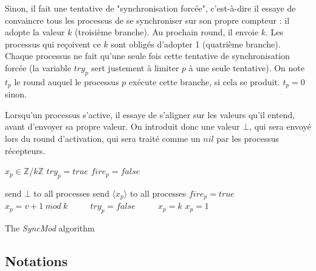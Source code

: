 \documentclass{article}
\begin{document}
Sinon, il fait une tentative de "synchronisation forcée", c'est-à-dire il essaye de convaincre tous les processus de se synchroniser sur son propre compteur :
il adopte la valeur $k$ (troisième branche). Au prochain round, il envoie $k$.  Les processus qui reçoivent ce $k$ sont obligés d'adopter 1 (quatrième branche).
Chaque processus ne fait qu'une seule fois cette tentative de synchronisation forcée (la variable $try_p$ sert justement à limiter $p$ à une seule tentative).
On note $t_p$ le round auquel le processus $p$ exécute cette branche, si cela se produit. $t_p = 0$ sinon.

Lorsqu'un processus s'active, il essaye de s'aligner sur les valeurs qu'il entend, avant d'envoyer sa propre valeur.
On introduit donc une valeur $\bot$, qui sera envoyé lors du round d'activation, qui sera traité comme un $nil$ par les processus récepteurs.

\pagebreak[1]

\begin{algorithm}[htb]
\begin{distribalgo}[1]
\BLANK {}
	\STATE $x_p \in \mathds{Z}/k\mathds{Z}$
	\STATE $try_p = true$
	\STATE $fire_p = false$

\ENDINDENT \BLANK

    \STATE send $\bot$ to all processes
  \ENDINDENT
\ENDINDENT
  \BLANK
{}
    \STATE send $\langle x_p \rangle$ to all processes
  \ENDINDENT
\ENDINDENT
  \BLANK
{}
	\STATE $fire_p = true$ ~~~~
	\ENDIF
	\STATE $x_p = v+1~mod~k$ ~~~~
	\STATE $try_p = false$ ~~~~
	\STATE $x_p = k$
	\ELSE
	\STATE $x_p = 1$ ~~~~
	\ENDIF
  \ENDINDENT
\ENDINDENT 
\caption{The {\em SyncMod} algorithm} \label{algo:R}
\end{distribalgo}

\end{algorithm}

\subsection{Notations}
\end{document}

